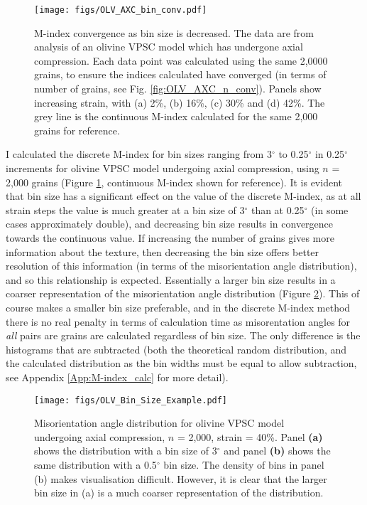 \documentclass[a4paper,12pt,twoside]{report}
\numberwithin{equation}{chapter}
\begin{document}
\begin{figure}[b!]
  \centering
    \texttt{[image: figs/OLV\_AXC\_bin\_conv.pdf]}
  \caption[Convergence with bin size (olivine)]{M-index convergence as bin size is decreased. The data are from analysis of an olivine VPSC model which has undergone axial compression. Each data point was calculated using the same 2,0000 grains, to ensure the indices calculated have converged (in terms of number of grains, see Fig. \ref{fig:OLV_AXC_n_conv}). Panels show increasing strain, with (a) 2\%, (b) 16\%, (c) 30\% and (d) 42\%. The grey line is the continuous M-index calculated for the same 2,000 grains for reference.}
  \label{fig:OLV_AXC_b_conv}
\end{figure}  

I calculated the discrete M-index for bin sizes ranging from 3$^\circ$ to 0.25$^\circ$ in 0.25$^\circ$ increments for olivine VPSC model undergoing axial compression, using $n$ = 2,000 grains (Figure \ref{fig:OLV_AXC_b_conv}, continuous M-index shown for reference). It is evident that bin size has a significant effect on the value of the discrete M-index, as at all strain steps the value is much greater at a bin size of 3$^\circ$ than at 0.25$^\circ$ (in some cases approximately double), and decreasing bin size results in convergence towards the continuous value. If increasing the number of grains gives more information about the texture, then decreasing the bin size offers better resolution of this information (in terms of the misorientation angle distribution), and so this relationship is expected. Essentially a larger bin size results in a coarser representation of the misorientation angle distribution (Figure \ref{fig:OLV_bin_size_example}). This of course makes a smaller bin size preferable, and in the discrete M-index method there is no real penalty in terms of calculation time as misorentation angles for \emph{all} pairs are grains are calculated regardless of bin size. The only difference is the histograms that are subtracted (both the theoretical random distribution, and the calculated distribution as the bin widths must be equal to allow subtraction, see Appendix \ref{App:M-index_calc} for more detail).

\begin{figure}[h]
  \centering
    \texttt{[image: figs/OLV\_Bin\_Size\_Example.pdf]}
  \caption[Bin size example (olivine VPSC)]{Misorientation angle distribution for olivine VPSC model undergoing axial compression, $n$ = 2,000, strain = 40\%. Panel \textbf{(a)} shows the distribution with a bin size of 3$^\circ$ and panel \textbf{(b)} shows the same distribution with a 0.5$^\circ$ bin size. The density of bins in panel (b) makes visualisation difficult. However, it is clear that the larger bin size in (a) is a much coarser representation of the distribution.}
  \label{fig:OLV_bin_size_example}
\end{figure}  
\end{document}
